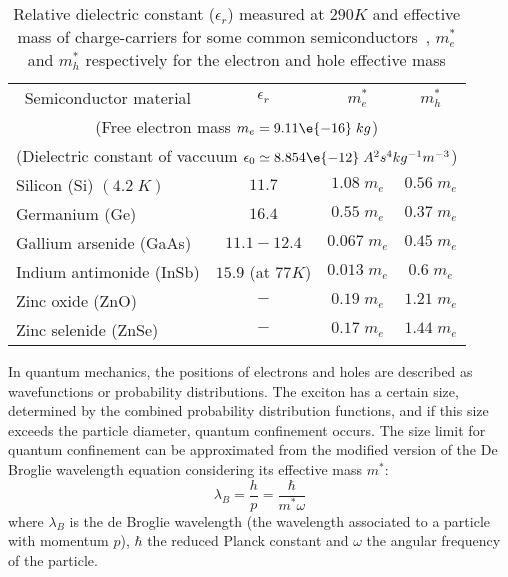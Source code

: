 \begin{table}[ht]
\centering
\begin{tabular}{l|c|c|c} 

\toprule[1pt]  
\multicolumn{1}{c|}{Semiconductor material} & \multicolumn{1}{c|}{$\epsilon_r$} & \multicolumn{1}{|c|}{$m^*_e$} & \multicolumn{1}{|c}{$m^*_h$} \\
\multicolumn{4}{c}{(Free electron mass $m_e=9.11  \e{-16} \; kg$)} \\
\multicolumn{4}{c}{(Dielectric constant of vaccuum $\epsilon_0 \simeq 8.854 \e{-12} \; A^2 s^4 kg^{-1} m^{-3} $)} \\
\hline                    %

Silicon (Si) $(4.2 \;K)$ & $ 11.7 $ & $1.08 \; m_e$ & $0.56 \; m_e$\\ %
Germanium (Ge) & $ 16.4 $ & $0.55 \; m_e$ & $0.37 \; m_e$\\ %
Gallium arsenide (GaAs) & $ 11.1-12.4$ & $0.067 \; m_e$ & $0.45 \; m_e$\\ %
Indium antimonide (InSb)  & $ 15.9$ (at $77K$) & $0.013 \; m_e$ & $0.6 \; m_e$\\ %
Zinc oxide (ZnO)  & $ - $ & $0.19 \; m_e$ & $1.21 \; m_e$\\ %
Zinc selenide (ZnSe)  & $-$ & $0.17 \; m_e$ & $1.44 \; m_e$\\ %
\bottomrule[1pt]
\end{tabular}
 \caption{Relative dielectric constant ($\epsilon_r$) measured at $290K$ \cite{Willardson1971} and effective mass of charge-carriers for some common semiconductors~\cite{Harrison1989}, $m^*_e$ and $m^*_h$ respectively for the electron and hole effective mass}
\label{table:effectiveMass} 
\end{table} 



In quantum mechanics, the positions of electrons and holes are described as wavefunctions or probability distributions. The exciton has a certain size, determined by the combined probability distribution functions, and if this size exceeds the particle diameter, quantum confinement occurs.
The size limit for quantum confinement can be approximated from the modified version of the De Broglie wavelength equation considering its effective mass $m^*$:
\begin{equation}
\lambda_B = \frac{h}{p} = \frac{\hbar}{m^* \omega}
\label{eq:deBroglie}
\end{equation}
where $\lambda_B$ is the de Broglie wavelength (the wavelength associated to a particle with momentum $p$), $\hbar$ the reduced Planck constant and $\omega$ the angular frequency of the particle.

